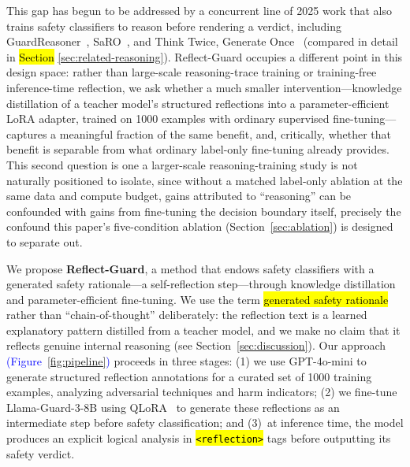 \documentclass[superintelligence,article,accept,moreauthors]{Definitions/mdpi}
\newcommand{\authchg}[1]{\textcolor{blue}{#1}}
\begin{document}
This gap has begun to be addressed by a concurrent line of 2025 work that also trains safety classifiers to reason before rendering a verdict, including GuardReasoner~\citep{liu2025guardreasoner}, SaRO~\citep{mou2025saro}, and Think Twice, Generate Once~\citep{phan2025thinktwice} (compared in detail in \hl{Section}
 \ref{sec:related-reasoning}). Reflect-Guard occupies a different point in this design space: rather than large-scale reasoning-trace training or training-free inference-time reflection, we ask whether a much smaller intervention---knowledge distillation of a teacher model's structured reflections into a parameter-efficient LoRA adapter, trained on 1000 examples with ordinary supervised fine-tuning---captures a meaningful fraction of the same benefit, and, critically, whether that benefit is separable from what ordinary label-only fine-tuning already provides. This second question is one a larger-scale reasoning-training study is not naturally positioned to isolate, since without a matched label-only ablation at the same data and compute budget, gains attributed to ``reasoning'' can be confounded with gains from fine-tuning the decision boundary itself, precisely the confound this paper's five-condition ablation (Section~\ref{sec:ablation}) is designed to separate out.

We propose \textbf{Reflect-Guard}, a method that endows safety classifiers with a generated safety rationale---a self-reflection step---through knowledge distillation and parameter-efficient fine-tuning. We use the term \hl{generated safety rationale}
 rather than ``chain-of-thought'' deliberately: the reflection text is a learned explanatory pattern distilled from a teacher model, and we make no claim that it reflects genuine internal reasoning (see Section~\ref{sec:discussion}). Our approach \authchg{(Figure~\ref{fig:pipeline})} proceeds in three stages: (1) we use GPT-4o-mini to generate structured reflection annotations for a curated set of 1000 training examples, analyzing adversarial techniques and harm indicators; (2) we fine-tune Llama-Guard-3-8B using QLoRA~\citep{dettmers2024qlora} to generate these reflections as an intermediate step before safety classification; and (3)~at inference time, the model produces an explicit logical analysis in \hl{\texttt{<reflection>}
} tags before outputting its safety verdict.
\end{document}
